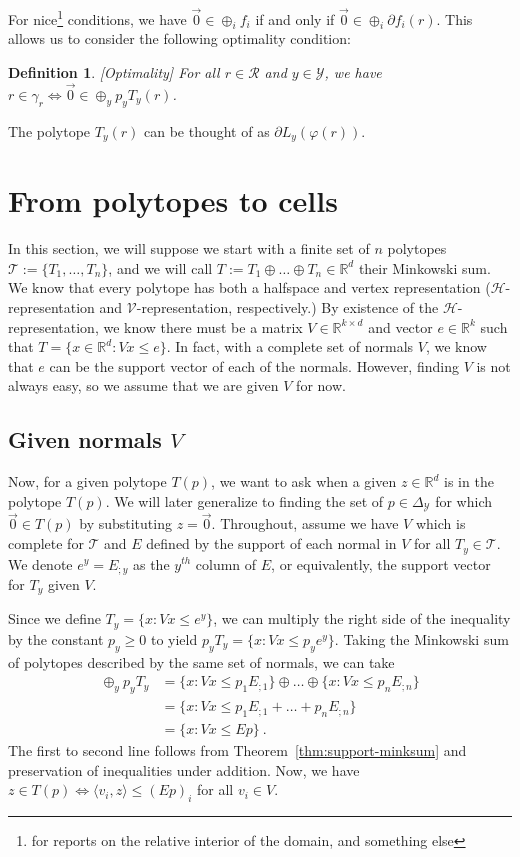 \documentclass[12pt]{article}
\newcommand{\reals}{\mathbb{R}}
\newcommand{\simplex}{\Delta_\Y}
\renewcommand{\H}{\mathcal{H}}
\newcommand{\R}{\mathcal{R}}
\newcommand{\T}{\mathcal{T}}
\newcommand{\V}{\mathcal{V}}
\newcommand{\Y}{\mathcal{Y}}
\newcommand{\inprod}[2]{\langle #1, #2 \rangle}%
\newtheorem{definition}{Definition}
\begin{document}
  For nice\footnote{for reports on the relative interior of the domain, and something else} conditions, we have $\vec 0 \in \oplus_i f_i$ if and only if $\vec 0 \in \oplus_i \partial f_i(r)$.
  This allows us to consider the following optimality condition:
  \begin{definition}\label{def:optimality}[Optimality]
  	For all $r \in \R$ and $y \in \Y$, we have $r \in \gamma_r \iff \vec 0 \in \oplus_y p_y T_y(r)$.
  \end{definition}
  The polytope $T_y(r)$ can be thought of as $\partial L_y(\varphi(r))$.

  \section{From polytopes to cells}\label{sec:start-polytope}
  In this section, we will suppose we start with a finite set of $n$ polytopes $\T := \{T_1, \ldots, T_n\}$, and we will call $T := T_1 \oplus \ldots \oplus T_n \in \reals^d$ their Minkowski sum.
  We know that every polytope has both a halfspace and vertex representation ($\H$-representation and $\V$-representation, respectively.)
  By existence of the $\H$-representation, we know there must be a matrix $V \in \reals^{k \times d}$ and vector $e \in \reals^k$ such that $T = \{x \in \reals^d : Vx \leq e\}$.
  In fact, with a complete set of normals $V$, we know that $e$ can be the support vector of each of the normals.
  However, finding $V$ is not always easy, so we assume that we are given $V$ for now.
  
  \subsection{Given normals $V$}
  Now, for a given polytope $T(p)$, we want to ask when a given $z \in \reals^d$ is in the polytope $T(p)$.
  We will later generalize to finding the set of $p \in \simplex$ for which $\vec 0 \in T(p)$ by substituting $z= \vec 0$.
  Throughout, assume we have $V$ which is complete for $\T$ and $E$ defined by the support of each normal in $V$ for all $T_y \in \T$.
  We denote $e^y = E_{;y}$ as the $y^{th}$ column of $E$, or equivalently, the support vector for $T_y$ given $V$.
  
  Since we define $T_y = \{x : Vx \leq e^y\}$, we can multiply the right side of the inequality by the constant $p_y \geq  0$ to yield $p_y T_y = \{x : Vx \leq p_y e^y\}$.
  Taking the Minkowski sum of polytopes described by the same set of normals, we can take 
  \begin{align*}
  \oplus_y p_y T_y &= \{x : Vx \leq p_1 E_{;1}\} \oplus \ldots \oplus \{x : Vx \leq p_n E_{;n}\} \\
  &= \{x : Vx \leq p_1 E_{;1} + \ldots + p_n E_{;n}\}\\
  &= \{x : Vx \leq E p\}~.~
  \end{align*}
  The first to second line follows from Theorem~\ref{thm:support-minksum} and preservation of inequalities under addition.
  Now, we have $z \in T(p) \iff \inprod{v_i}{z} \leq (Ep)_i$ for all $v_i \in V$.
  
\end{document}
